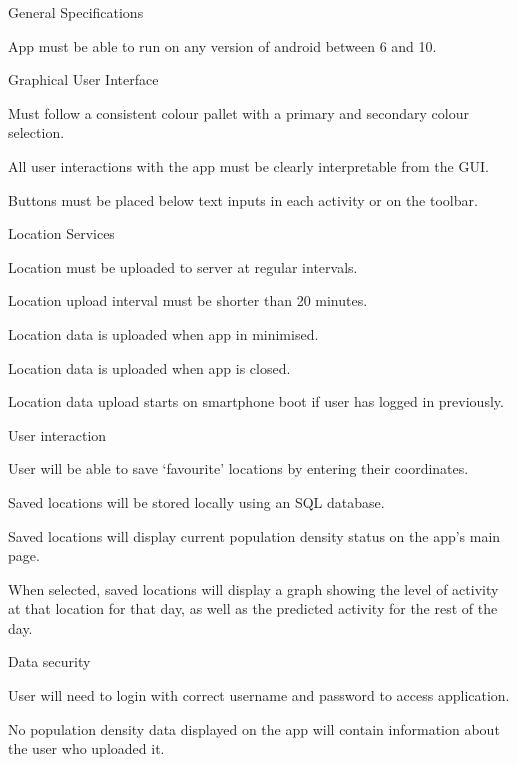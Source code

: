 \begin{SA}
    \item General Specifications
    \begin{SA}
        \item App must be able to run on any version of android between 6 and 10.
    \end{SA}
    \item Graphical User Interface
    \begin{SA}
        \item Must follow a consistent colour pallet with a primary and secondary colour selection.
        \item All user interactions with the app must be clearly interpretable from the GUI.
        \item Buttons must be placed below text inputs in each activity or on the toolbar.
    \end{SA}
    \item Location Services
    \begin{SA}
        \item Location must be uploaded to server at regular intervals.
        \item Location upload interval must be shorter than 20 minutes.
        \item Location data is uploaded when app in minimised.
        \item Location data is uploaded when app is closed.
        \item Location data upload starts on smartphone boot if user has logged in previously.   
    \end{SA}
    \item User interaction
    \begin{SA}
        \item User will be able to save ‘favourite’ locations by entering their coordinates.
        \item Saved locations will be stored locally using an SQL database.
        \item Saved locations will display current population density status on the app’s main page.
        \item When selected, saved locations will display a graph showing the level of activity at that location for that day, as well as the predicted activity for the rest of the day.
    \end{SA}
    \item Data security
    \begin{SA}
        \item User will need to login with correct username and password to access application.
        \item No population density data displayed on the app will contain information about the user who uploaded it.
    \end{SA}
\end{SA}

